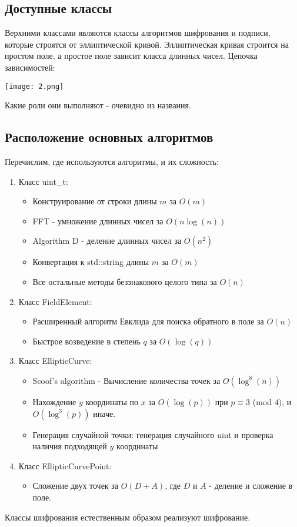\documentclass{article}
\begin{document}
\subsection{Доступные классы}
Верхними классами являются классы алгоритмов шифрования и подписи, которые строятся от эллиптической кривой. Эллиптическая кривая строится на простом поле, а простое поле зависит класса длинных чисел. Цепочка зависимостей:

\begin{center}
  \texttt{[image: 2.png]}
\end{center}

Какие роли они выполняют - очевидно из названия.
\subsection{Расположение основных алгоритмов}
Перечислим, где используются алгоритмы, и их сложность:
\begin{enumerate}
  \item Класс uint\_t:
  \begin{itemize}
    \item Конструирование от строки длины $m$ за $O(m)$ 
    \item FFT - умножение длинных чисел за $O(n\log(n))$
    \item Algorithm D - деление длинных чисел за $O(n^2)$
    \item Конвертация к std::string длины $m$ за $O(m)$
    \item Все остальные методы беззнакового целого типа за $O(n)$
  \end{itemize}
  \item Класс FieldElement:
  \begin{itemize}
    \item Расширенный алгоритм Евклида для поиска обратного в поле за $O(n)$
    \item Быстрое возведение в степень $q$ за $O(\log(q))$
  \end{itemize}
  \item Класс EllipticCurve:
  \begin{itemize}
    \item Scoof's algorithm - Вычисление количества точек за $O(\log^8(n))$
    \item Нахождение $y$ координаты по $x$ за $O(\log(p))$ при $p\equiv 3$ (mod 4), и $O(\log^3(p))$ иначе. 
    \item Генерация случайной точки: генерация случайного uint и проверка наличия подходящей $y$ координаты
  \end{itemize}
  \item Класс EllipticCurvePoint:
  \begin{itemize}
    \item Сложение двух точек за $O(D + A)$, где $D$ и $A$ - деление и сложение в поле. 
  \end{itemize}
\end{enumerate}
Классы шифрования естественным образом реализуют шифрование.
\end{document}

